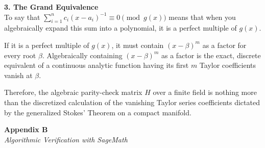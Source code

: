 \documentclass[11pt]{article}
\begin{document}
\begin{mdframed}[backgroundcolor=white, linecolor=black, linewidth=1.5pt, roundcorner=5pt, innerleftmargin=15pt, innerrightmargin=15pt, innertopmargin=15pt, innerbottommargin=15pt]
		\vspace{0.5cm}
		\textbf{3. The Grand Equivalence} \\
		To say that $\sum_{i=1}^n c_i (x - a_i)^{-1} \equiv 0 \pmod{g(x)}$ means that when you algebraically expand this sum into a polynomial, it is a perfect multiple of $g(x)$. 
		
		If it is a perfect multiple of $g(x)$, it must contain $(x - \beta)^m$ as a factor for every root $\beta$. Algebraically containing $(x - \beta)^m$ as a factor is the exact, discrete equivalent of a continuous analytic function having its first $m$ Taylor coefficients vanish at $\beta$. 
		
		Therefore, the algebraic parity-check matrix $H$ over a finite field is nothing more than the discretized calculation of the vanishing Taylor series coefficients dictated by the generalized Stokes' Theorem on a compact manifold.
	\end{mdframed}

	\newpage
	\begin{center}
		{\Huge \textbf{Appendix B}} \\
		\vspace{0.3cm}
		{\Large \textit{Algorithmic Verification with SageMath}}
	\end{center}
	
	\vspace{1cm}
	
\end{document}
